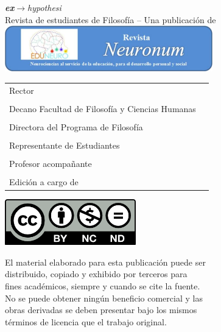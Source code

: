 {\small

\begin{center}
	{\Huge\textit{\textcolor{ehAzul1}{\textbf{ex}}\textcolor{ehAzul2}{$\rightarrow$}\textcolor{ehAzul1}{\vspace{-0.4cm}hypothesi}}}\\[0.5cm]
	Revista de estudiantes de Filosofía -- Una publicación de
	\includegraphics[width=9.021cm,height=1.984cm]{img/logo-neuronum.png}
\end{center}

\begin{longtable}[]{@{}ll@{}}
	\toprule[0.5pt]
	\midrule[0.5pt]
	\endhead
	Rector & \rector{}\tabularnewline
	&\tabularnewline
	Decano Facultad de Filosofía y Ciencias Humanas & \decano{}\tabularnewline
	&\tabularnewline
	Directora del Programa de Filosofía & \director{}\tabularnewline
	&\tabularnewline
	Representante de Estudiantes & \representante{}\tabularnewline
	&\tabularnewline
	Profesor acompañante & \profesores{}\tabularnewline
	&\tabularnewline
	Edición a cargo de & \editores{}\tabularnewline
	\bottomrule[0.5pt]
\end{longtable}
\newpage

\begin{center}
	\includegraphics[width=2.24419in,height=0.78333in]{img/CC-BY-NC-ND.png}
\end{center}

\begin{flushleft}

El material elaborado para esta publicación puede ser\\
distribuido, copiado y exhibido por terceros para\\
fines académicos, siempre y cuando se cite la fuente.\\
No se puede obtener ningún beneficio comercial y las\\
obras derivadas se deben presentar bajo los mismos\\
términos de licencia que el trabajo original.


\end{flushleft}}
